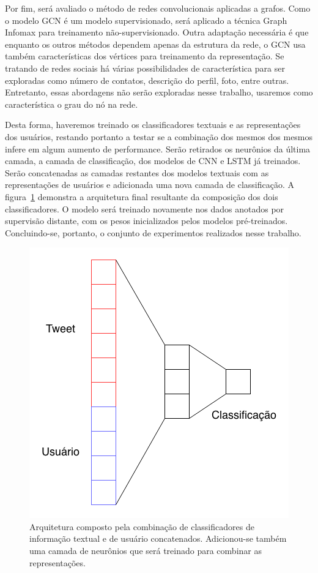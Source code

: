 Por fim, será avaliado o método de redes convolucionais aplicadas a grafos.
Como o modelo GCN é um modelo supervisionado, será aplicado a técnica Graph
Infomax para treinamento não-supervisionado.
Outra adaptação necessária é que enquanto os outros métodos dependem apenas da
estrutura da rede, o GCN usa também características dos vértices para
treinamento da representação.
Se tratando de redes sociais há várias possibilidades de característica para ser
exploradas como número de contatos, descrição do perfil, foto, entre outras.
Entretanto, essas abordagens não serão exploradas nesse trabalho, usaremos como
característica o grau do nó na rede.

Desta forma, haveremos treinado os classificadores textuais e as representações
dos usuários, restando portanto a testar se a combinação dos mesmos dos mesmos
infere em algum aumento de performance.
Serão retirados os neurônios da última camada, a camada de classificação, dos
modelos de CNN e LSTM já treinados.
Serão concatenadas as camadas restantes dos modelos textuais com as
representações de usuários e adicionada uma nova camada de classificação.
A figura~\ref{fig:network_composition} demonstra a arquitetura final resultante
da composição dos dois classificadores.
O modelo será treinado novamente nos dados anotados por supervisão distante, com
os pesos inicializados pelos modelos pré-treinados.
Concluindo-se, portanto, o conjunto de experimentos realizados nesse trabalho.

\begin{figure}[h]
\begin{center} {
    \begin{center}
    \includegraphics[scale=0.45]{images/network_composition.png}
    \caption{Arquitetura composto pela combinação de classificadores de
        informação textual e de usuário concatenados. Adicionou-se também uma
        camada de neurônios que será treinado para combinar as representações.}
    \label{fig:network_composition}
    \end{center}
}
\end{center}
\end{figure}
